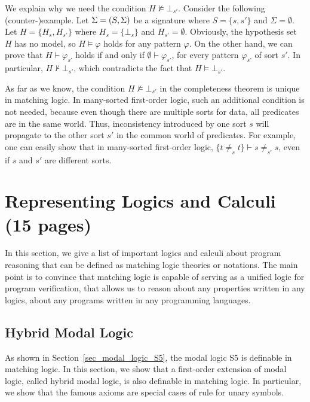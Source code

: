 \documentclass{amsart}
\begin{document}
We explain why we need the condition
$H \not\vDash \bot_{s'}$.
Consider the following (counter-)example.
Let ${\Sigma} = (S,\Sigma)$ be a signature
where $S = \{s,s'\}$ and $\Sigma = \emptyset$.
Let $H = \{ H_s , H_{s'} \}$ where
$H_s = \{ \bot_s \}$ and $H_{s'} = \emptyset$.
Obviously, the hypothesis set $H$ has no model,
so $H \vDash \varphi$ holds for any pattern $\varphi$.
On the other hand,
we can prove that
$H \vdash \varphi_{s'}$ holds if and only if
$\emptyset \vdash \varphi_{s'}$,
for every pattern $\varphi_{s'}$ of sort $s'$.
In particular, $H \not\vdash \bot_{s'}$,
which contradicts the fact that
$H \vDash \bot_{s'}$.

As far as we know, the condition $H \not\vDash \bot_{s'}$
in the completeness theorem is unique in matching logic.
In many-sorted first-order logic,
such an additional condition is not needed, because even though
there are multiple sorts for data, all predicates are in the same world.
Thus, inconsistency introduced by one sort $s$ will propagate to the other sort $s'$
in the common world of predicates.
For example, one can easily show that in many-sorted first-order logic,
$\{ t \neq_s t \} \vdash s \neq_{s'} s$,
even if $s$ and $s'$ are different sorts.



\section{Representing Logics and Calculi (15 pages)}

In this section, we give a list of important logics and calculi about
program reasoning that can be defined as matching logic theories or notations.
The main point is to convince that matching logic is capable of
serving as a unified logic for program verification,
that allows us to reason about any properties written in any logics,
about any programs written in any programming languages.

\subsection{Hybrid Modal Logic}
\label{sec_hybrid_modal_logic}

As shown in Section~\ref{sec_modal_logic_S5},
the modal logic S5 is definable in matching logic.
In this section, we show that
a first-order extension of modal logic, called hybrid modal logic,
is also definable in matching logic.
In particular, we show that the famous  axioms are special cases
of rule \propagationexists for unary symbols.
\end{document}
